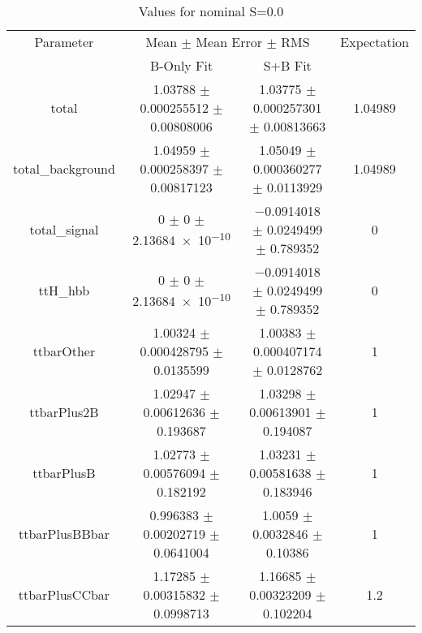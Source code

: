 \begin{table}
\centering
\caption{Values for nominal S=0.0}
\begin{tabular}{cccc}
\toprule
Parameter & \multicolumn{2}{c}{Mean $\pm$ Mean Error $\pm$ RMS} & Expectation\\
 & B-Only Fit & S+B Fit & \\
\midrule
total & \num{1.03788} $\pm$ \num{0.000255512} $\pm$ \num{0.00808006} & \num{1.03775} $\pm$ \num{0.000257301} $\pm$ \num{0.00813663} & \num{1.04989}\\
total\_background & \num{1.04959} $\pm$ \num{0.000258397} $\pm$ \num{0.00817123} & \num{1.05049} $\pm$ \num{0.000360277} $\pm$ \num{0.0113929} & \num{1.04989}\\
total\_signal & \num{0} $\pm$ \num{0} $\pm$ \num{2.13684e-10} & \num{-0.0914018} $\pm$ \num{0.0249499} $\pm$ \num{0.789352} & \num{0}\\
ttH\_hbb & \num{0} $\pm$ \num{0} $\pm$ \num{2.13684e-10} & \num{-0.0914018} $\pm$ \num{0.0249499} $\pm$ \num{0.789352} & \num{0}\\
ttbarOther & \num{1.00324} $\pm$ \num{0.000428795} $\pm$ \num{0.0135599} & \num{1.00383} $\pm$ \num{0.000407174} $\pm$ \num{0.0128762} & \num{1}\\
ttbarPlus2B & \num{1.02947} $\pm$ \num{0.00612636} $\pm$ \num{0.193687} & \num{1.03298} $\pm$ \num{0.00613901} $\pm$ \num{0.194087} & \num{1}\\
ttbarPlusB & \num{1.02773} $\pm$ \num{0.00576094} $\pm$ \num{0.182192} & \num{1.03231} $\pm$ \num{0.00581638} $\pm$ \num{0.183946} & \num{1}\\
ttbarPlusBBbar & \num{0.996383} $\pm$ \num{0.00202719} $\pm$ \num{0.0641004} & \num{1.0059} $\pm$ \num{0.0032846} $\pm$ \num{0.10386} & \num{1}\\
ttbarPlusCCbar & \num{1.17285} $\pm$ \num{0.00315832} $\pm$ \num{0.0998713} & \num{1.16685} $\pm$ \num{0.00323209} $\pm$ \num{0.102204} & \num{1.2}\\
\bottomrule
\end{tabular}
\end{table}
